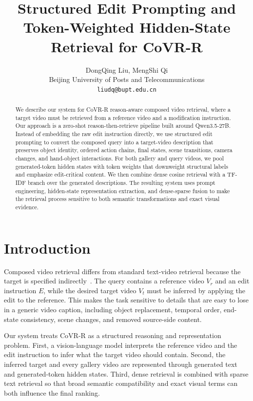 \documentclass[10pt,twocolumn,letterpaper]{article}
\title{Structured Edit Prompting and Token-Weighted Hidden-State Retrieval for CoVR-R}
\author{
DongQing Liu, MengShi Qi\\
Beijing University of Posts and Telecommunications\\
{\tt\small liudq@bupt.edu.cn}
}
\begin{document}
\maketitle

\begin{abstract}
We describe our system for CoVR-R reason-aware composed video retrieval, where a target video must be retrieved from a reference video and a modification instruction.
Our approach is a zero-shot reason-then-retrieve pipeline built around Qwen3.5-27B.
Instead of embedding the raw edit instruction directly, we use structured edit prompting to convert the composed query into a target-video description that preserves object identity, ordered action chains, final states, scene transitions, camera changes, and hand-object interactions.
For both gallery and query videos, we pool generated-token hidden states with token weights that downweight structural labels and emphasize edit-critical content.
We then combine dense cosine retrieval with a TF-IDF branch over the generated descriptions.
The resulting system uses prompt engineering, hidden-state representation extraction, and dense-sparse fusion to make the retrieval process sensitive to both semantic transformations and exact visual evidence.
\end{abstract}

\section{Introduction}

Composed video retrieval differs from standard text-video retrieval because the target is specified indirectly~\cite{thawakar2026covrr}.
The query contains a reference video $V_r$ and an edit instruction $E$, while the desired target video $V_t$ must be inferred by applying the edit to the reference.
This makes the task sensitive to details that are easy to lose in a generic video caption, including object replacement, temporal order, end-state consistency, scene changes, and removed source-side content.

Our system treats CoVR-R as a structured reasoning and representation problem.
First, a vision-language model interprets the reference video and the edit instruction to infer what the target video should contain.
Second, the inferred target and every gallery video are represented through generated text and generated-token hidden states.
Third, dense retrieval is combined with sparse text retrieval so that broad semantic compatibility and exact visual terms can both influence the final ranking.
\end{document}
